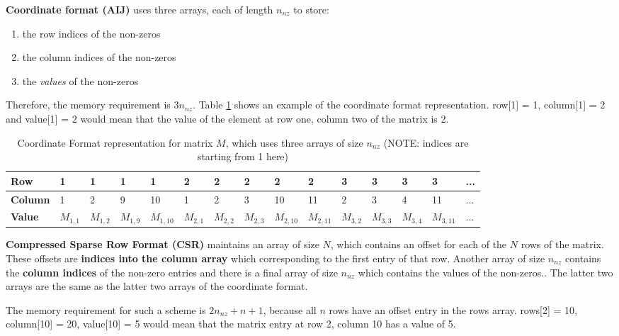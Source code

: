 \documentclass{article}
\begin{document}
\textbf{Coordinate format (AIJ)} uses three arrays, each of length $n_{nz}$ to store:
\begin{enumerate}
	\item the row indices of the non-zeros
	\item the column indices of the non-zeros
	\item the \textit{values} of the non-zeros
\end{enumerate}
Therefore, the memory requirement is $3n_{nz}$. Table \ref{tab:coordinate-format} shows an example of the coordinate format representation. row[1] = 1, column[1] = 2 and value[1] = $2$ would mean that the value of the element at row one, column two of the matrix is 2.

\begin{table}
	\centering
	\begin{tabular}{|l|llllllllllllll|}
		\hline
		\textbf{Row} & 1 & 1 & 1 & 1 & 2 & 2 & 2 & 2 & 2 & 3 & 3 & 3 & 3 & ... \\
		\hline
		\textbf{Column} & 1 & 2 & 9 & 10 & 1 & 2 & 3 & 10 & 11 & 2 & 3 & 4 & 11 & ... \\
		\hline
		\textbf{Value} & $M_{1,1}$ & $M_{1,2}$ & $M_{1,9}$ & $M_{1,10}$ & $M_{2,1}$ & $M_{2,2}$ & $M_{2,3}$ & $M_{2,10}$ & $M_{2,11}$ & $M_{3,2}$ & $M_{3,3}$ & $M_{3,4}$ & $M_{3,11}$ & ... \\
		\hline
	\end{tabular}
	\caption{Coordinate Format representation for matrix $M$, which uses three arrays of size $n_{nz}$ (NOTE: indices are starting from 1 here)}
	\label{tab:coordinate-format}
\end{table}

\textbf{Compressed Sparse Row Format (CSR)} maintains an array of size $N$, which contains an offset for each of the $N$ rows of the matrix. These offsets are \textbf{indices into the column array} which corresponding to the first entry of that row. Another array of size $n_{nz}$ contains the \textbf{column indices} of the non-zero entries and there is a final array of size $n_{nz}$ which contains the values of the non-zeros.. The latter two arrays are the same as the latter two arrays of the coordinate format.

The memory requirement for such a scheme is $2n_{nz} + n + 1$, because all $n$ rows have an offset entry in the rows array. rows[2] = 10, column[10] = 20, value[10] = 5 would mean that the matrix entry at row 2, column 10 has a value of 5.
\end{document}
